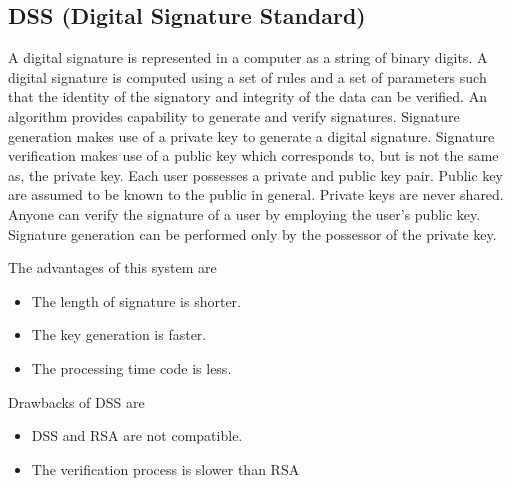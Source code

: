\documentclass[conference]{IEEEtran}
\begin{document}
\subsection{{\large DSS (Digital Signature Standard)}}
A digital signature is represented in a computer as a string of binary digits\cite{dss}. A digital signature is computed using a set of rules and a set of parameters such that the identity of the signatory and integrity of the data can be verified. An algorithm provides capability to generate and verify signatures. Signature generation\cite{dss} makes use of a private key to generate a digital signature. Signature verification\cite{dss} makes use of a public key which corresponds to, but is not the same as, the private key. Each user possesses a private and public key pair. Public key are assumed to be known to the public in general. Private keys are never shared. Anyone can verify the signature of a user by employing the user's public key. Signature generation can be performed only by the possessor of the private key.

The advantages of this system are
\begin{itemize}
	\item The length of signature is shorter.
	\item The key generation is faster.
	\item The processing time code is less.
\end{itemize}

Drawbacks of DSS are
\begin{itemize}
	\item DSS and RSA are not compatible.
	\item The verification process is slower than RSA
\end{itemize}
\end{document}

